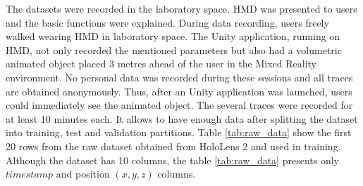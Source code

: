 The datasets were recorded in the laboratory space. HMD was presented to users and the basic functions were explained. During data recording, users freely walked wearing HMD in laboratory space. The Unity application, running on HMD, not only recorded the mentioned parameters but also had a volumetric animated object placed 3 metres ahead of the user in the Mixed Reality environment. No personal data was recorded during these sessions and all traces are obtained anonymously. Thus, after an Unity application was launched, users could immediately see the animated object. The several traces were recorded for at least 10 minutes each. It allows to have enough data after splitting the dataset into training, test and validation partitions. Table \ref{tab:raw_data} show the first 20 rows from the raw dataset obtained from HoloLens 2 and used in training. Although the dataset has 10 columns, the table \ref{tab:raw_data} presents only $timestamp$ and position $(x, y, z)$ columns. 

